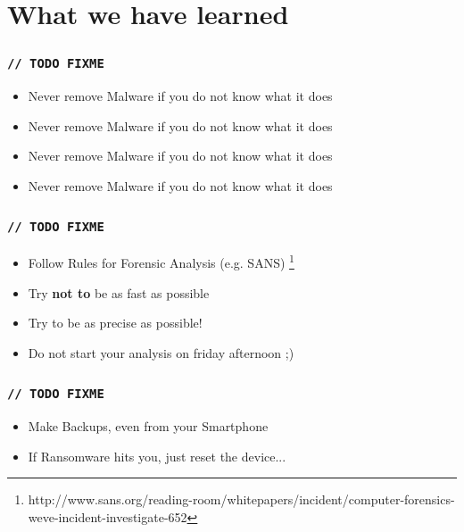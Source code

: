 \documentclass[12pt,a4paper]{beamer}
\begin{document}
\section{What we have learned}

\begin{frame}
\frametitle{\texttt{// TODO FIXME}}
\begin{itemize}
	\item Never remove Malware if you do not know what it does
	\item Never remove Malware if you do not know what it does
	\item Never remove Malware if you do not know what it does
	\item Never remove Malware if you do not know what it does

\end{itemize}

\end{frame}

\begin{frame}
\frametitle{\texttt{// TODO FIXME}}
\begin{itemize}
	\item Follow Rules for Forensic Analysis (e.g. SANS) \footnote{http://www.sans.org/reading-room/whitepapers/incident/computer-forensics-weve-incident-investigate-652}
	\item Try \textbf{not to} be as fast as possible
	\item Try to be as precise as possible!
	\item Do not start your analysis on friday afternoon ;)
\end{itemize}
\end{frame}

\begin{frame}
\frametitle{\texttt{// TODO FIXME}}

\begin{itemize}
	\item Make Backups, even from your Smartphone
	\item If Ransomware hits you, just reset the device...
\end{itemize}

\end{frame}
\end{document}
